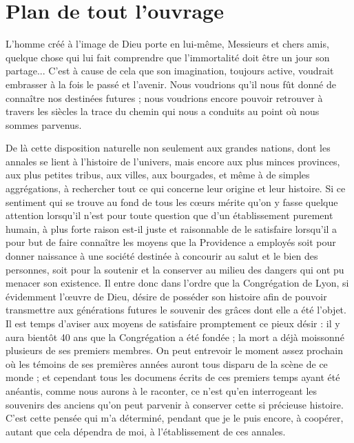 \chapter*{Plan de tout l'ouvrage}

L'homme créé à l'image de Dieu porte en lui-même, Messieurs et chers amis, quelque chose qui lui fait comprendre que l'immortalité doit être un jour son partage... C'est à cause de cela que son imagination, toujours active, voudrait embrasser à la fois le passé et l'avenir. Nous voudrions qu'il nous fût donné de connaître nos destinées futures ; nous voudrions encore pouvoir retrouver à travers les siècles la trace du chemin qui nous a conduits au point où nous sommes parvenus.

De là cette disposition naturelle non seulement aux grandes nations, dont les annales se lient à l'histoire de l'univers, mais encore aux plus minces provinces, aux plus petites tribus, aux villes, aux bourgades, et même à de simples aggrégations, à rechercher tout ce qui concerne leur origine et leur histoire. Si ce sentiment qui se trouve au fond de tous les cœurs mérite qu'on y fasse quelque attention lorsqu'il n'est pour toute question que d'un établissement purement humain, à plus forte raison est-il juste et raisonnable de le satisfaire lorsqu'il a pour but de faire connaître les moyens que la Providence a employés soit pour donner naissance à une société destinée à concourir au salut et le bien des personnes, soit pour la soutenir et la conserver au milieu des dangers qui ont pu menacer son existence. Il entre donc dans l'ordre que la Congrégation de Lyon, si évidemment l'œuvre de Dieu, désire de posséder son histoire afin de pouvoir transmettre aux générations futures le souvenir des grâces dont elle a
été l'objet. Il est temps d'aviser aux moyens de satisfaire promptement ce pieux désir : il y aura bientôt 40 ans que la Congrégation a été fondée ; la mort a déjà moissonné plusieurs de ses premiers membres. On peut entrevoir le moment assez prochain où les témoins de ses premières années auront tous disparu de la scène de ce monde ; et cependant tous les documens écrits de ces premiers temps ayant été anéantis, comme nous aurons à le raconter, ce n'est qu'en interrogeant les souvenirs des anciens qu'on peut parvenir à conserver cette si précieuse histoire. C'est cette pensée qui m'a déterminé, pendant que je le puis encore, à coopérer, autant que cela dépendra de moi, à l'établissement de ces annales.

